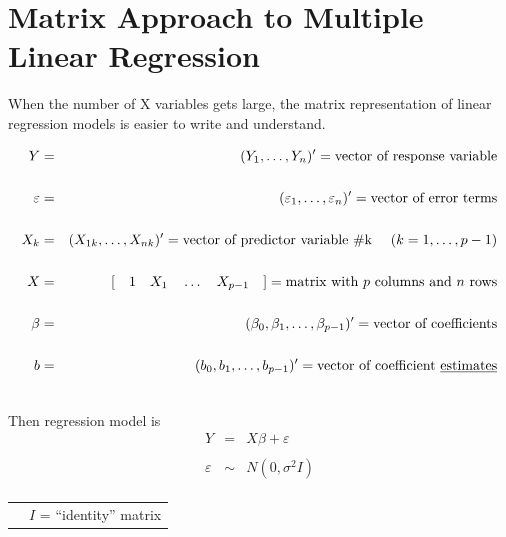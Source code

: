 \documentclass[12pt]{../notes}
\begin{document}
\newpage

\section{Matrix Approach to Multiple Linear Regression}

When the number of X variables gets large, the matrix representation of linear regression models is easier to write and understand. 


\begin{eqnarray}
  Y & = & (Y_1, \ldots, Y_n)'  =  \mbox{vector of response variable} \nonumber \\
   & \nonumber \\
  \varepsilon & = & (\varepsilon_1, \ldots, \varepsilon_n)'  =  \mbox{vector of error terms}  \nonumber \\
   & \nonumber \\
  X_k & = & (X_{1k}, \ldots, X_{nk})'  =  \mbox{vector of predictor variable \#k \hspace{1em}}(k=1,\ldots,p-1) \nonumber \\
   & \nonumber \\
  X & = & [\mbox{\hspace{1em}} 1 \mbox{\hspace{1em}} X_1 \mbox{\hspace{1em}} \ldots \mbox{\hspace{1em}} X_{p-1} \mbox{\hspace{1em}} ] 
      = \mbox{matrix with $p$ columns and $n$ rows} \nonumber \\
   & \nonumber \\
  \beta & = & (\beta_0, \beta_1, \ldots, \beta_{p-1})'  = \mbox{vector of coefficients} \nonumber \\
     & \nonumber \\
  b & = & (b_0, b_1, \ldots, b_{p-1})'  = \mbox{vector of coefficient \underline{estimates}} \nonumber \\
   & \nonumber
\end{eqnarray}

Then regression model is
\begin{eqnarray}
  Y & = & X \beta + \varepsilon \nonumber \\
    & \nonumber \\
  \varepsilon & \sim & N(0,\sigma^2 I) \nonumber \\
    & \nonumber
\end{eqnarray}

\vspace{-3.5em}
\begin{tabular}{l l}
\hspace{25em} &
\begin{minipage}[t]{2in}
 $I$ = ``identity'' matrix
\end{minipage}
\end{tabular}
\end{document}
